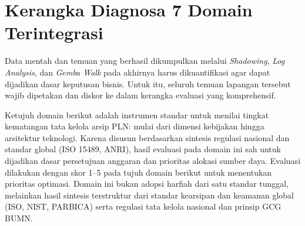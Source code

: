\documentclass[12pt,a4paper]{report}
\begin{document}

\section{Kerangka Diagnosa 7 Domain Terintegrasi}

Data mentah dan temuan yang berhasil dikumpulkan melalui \textit{Shadowing}, \textit{Log Analysis}, dan \textit{Gemba Walk} pada akhirnya harus dikuantifikasi agar dapat dijadikan dasar keputusan bisnis. Untuk itu, seluruh temuan lapangan tersebut wajib dipetakan dan diskor ke dalam kerangka evaluasi yang komprehensif.

Ketujuh domain berikut adalah instrumen standar untuk menilai tingkat kematangan tata kelola arsip PLN: mulai dari dimensi kebijakan hingga arsitektur teknologi. Karena disusun berdasarkan sintesis regulasi nasional dan standar global (ISO 15489, ANRI), hasil evaluasi pada domain ini sah untuk dijadikan dasar persetujuan anggaran dan prioritas alokasi sumber daya.
Evaluasi dilakukan dengan skor 1--5 pada tujuh domain berikut untuk menentukan prioritas optimasi. Domain ini bukan adopsi harfiah dari satu standar tunggal, melainkan hasil sintesis terstruktur dari standar kearsipan dan keamanan global (ISO, NIST, PARBICA) serta regulasi tata kelola nasional dan prinsip GCG BUMN.
\end{document}
